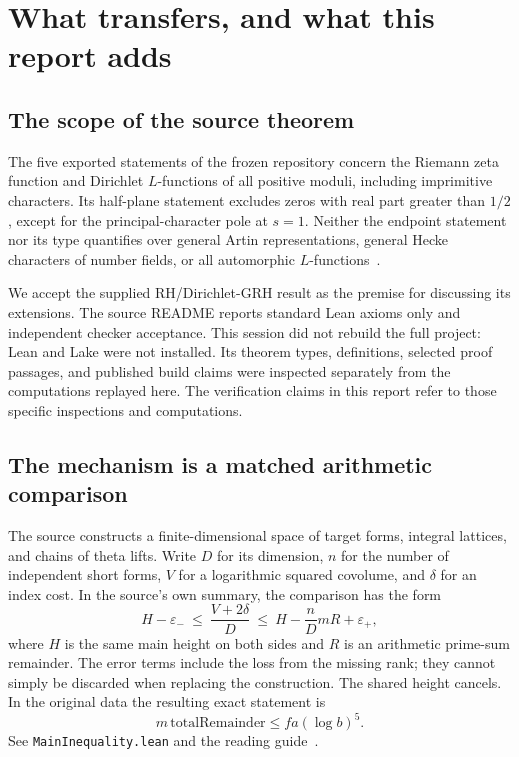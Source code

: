\section{What transfers, and what this report adds}

\subsection{The scope of the source theorem}

The five exported statements of the frozen repository concern the
Riemann zeta function and Dirichlet $L$-functions of all positive
moduli, including imprimitive characters.  Its half-plane statement
excludes zeros with real part greater than $1/2$, except for the
principal-character pole at $s=1$.  Neither the endpoint statement
nor its type quantifies over general Artin representations, general
Hecke characters of number fields, or all automorphic
$L$-functions~\cite{repo}.

We accept the supplied RH/Dirichlet-GRH result as the premise for
discussing its extensions. The source README reports standard Lean
axioms only and independent checker acceptance. This session did not
rebuild the full project: Lean and Lake were not installed. Its
theorem types, definitions, selected proof passages, and published
build claims were inspected separately from the computations replayed
here. The verification claims in this report refer to those
specific inspections and computations.

\subsection{The mechanism is a matched arithmetic comparison}

The source constructs a finite-dimensional space of target forms,
integral lattices, and chains of theta lifts. Write $D$ for its
dimension, $n$ for the number of independent short forms, $V$ for a
logarithmic squared covolume, and $\delta$ for an index cost.
In the source's own summary, the comparison has the form
\[
 H-\varepsilon_-\ \le\ \frac{V+2\delta}{D}
 \ \le\ H-\frac nD mR+\varepsilon_+,
\]
where $H$ is the same main height on both sides and $R$ is an
arithmetic prime-sum remainder. The error terms include the loss from
the missing rank; they cannot simply be discarded when replacing the
construction. The shared height cancels. In the original data the
resulting exact statement is
\[
                 m\,\mathrm{totalRemainder}
                      \le f a(\log b)^5.
\]
See 
{\texttt{MainInequality.lean}} and the reading guide~\cite{guide}.

